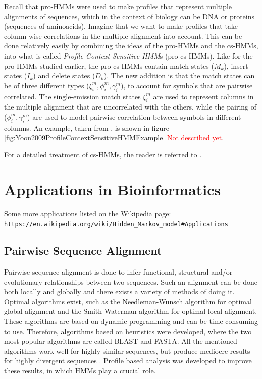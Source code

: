 \documentclass{article}
\begin{document}
Recall that pro-HMMs were used to make profiles that represent multiple alignments of sequences, which in the context of biology can be DNA or proteins (sequences of aminoacids). Imagine that we want to make profiles that take column-wise correlations in the multiple alignment into account. This can be done relatively easily by combining the ideas of the pro-HMMs and the cs-HMMs, into what is called \textit{Profile Context-Sensitive HMM}s (pro-cs-HMMs). Like for the pro-HMMs studied earlier, the pro-cs-HMMs contain match states ($M_k$), insert states ($I_k$) and delete states ($D_k$). The new addition is that the match states can be of three different types ($\xi_i^m, \phi_i^m, \gamma_i^m$), to account for symbols that are pairwise correlated. The single-emission match states $\xi_i^m$ are used to represent columns in the multiple alignment that are uncorrelated with the others, while the pairing of ($\phi_i^m, \gamma_i^m$) are used to model pairwise correlation between symbols in different columns. An example, taken from \cite{Yoon2009}, is shown in figure \ref{fig:Yoon2009ProfileContextSensitiveHMMExample} \textcolor{red}{Not described yet}.

For a detailed treatment of cs-HMMs, the reader is referred to \cite{Yoon2006}.

\section{Applications in Bioinformatics}
Some more applications listed on the Wikipedia page: \verb$https://en.wikipedia.org/wiki/Hidden_Markov_model#Applications$

\subsection{Pairwise Sequence Alignment}\label{Section:PairwiseSequenceAlignment}
Pairwise sequence alignment is done to infer functional, structural and/or evolutionary relationships between two sequences. Such an alignment can be done both locally and globally and there exists a variety of methods of doing it. Optimal algorithms exist, such as the Needleman-Wunsch algorithm for optimal global alignment and the Smith-Waterman algorithm for optimal local alignment. These algorithms are based on dynamic programming and can be time consuming to use. Therefore, algorithms based on heuristics were developed, where the two most popular algorithms are called BLAST and FASTA. All the mentioned algorithms work well for highly similar sequences, but produce mediocre results for highly divergent sequences \cite{Choo2004}. Profile based analysis was developed to improve these results, in which HMMs play a crucial role. 
\end{document}

